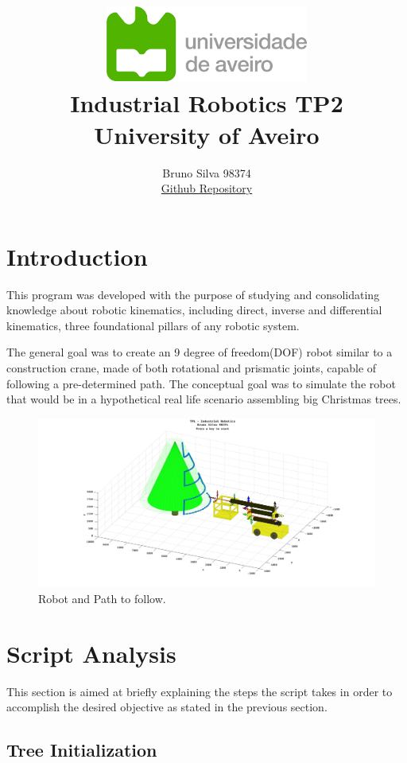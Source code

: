 \documentclass{report}
\title{
\includegraphics[width=0.5\textwidth]{resources/ua_logo.png} \\
Industrial Robotics TP2\\
\Large{University of Aveiro}
}
\author{Bruno Silva 98374\\
\href{https://github.com/brunofavs/TP2_RI}{Github Repository}
}
\begin{document}
\maketitle

\tableofcontents
\pagebreak


\section{Introduction}

This program was developed with the purpose of studying and consolidating
knowledge about robotic kinematics, including direct, inverse and differential
kinematics, three foundational pillars of any robotic system.

The general goal was to create an 9 degree of freedom(DOF) robot similar to a
construction crane, made of both rotational and prismatic joints, capable of
following a pre-determined path. The conceptual goal was to simulate the robot
that would be in a hypothetical real life scenario assembling big Christmas trees.

\begin{figure}[h]
    \centering
    \includegraphics[scale=0.2]{resources/system_home.jpg}
    \caption{\label{fig:home}Robot and Path to follow.}
\end{figure}


\section{Script Analysis}

This section is aimed at briefly explaining the steps the script takes in order
to accomplish the desired objective as stated in the previous section.

\subsection{Tree Initialization}
\end{document}
